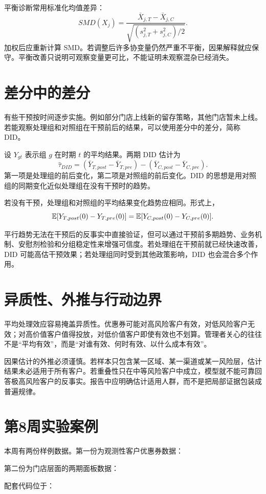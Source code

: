 \documentclass[UTF8,fontset=fandol,openany,zihao=-4]{ctexbook}
\begin{document}
平衡诊断常用标准化均值差异：
\[
  SMD(X_j)
  =
  \frac{\bar X_{j,T}-\bar X_{j,C}}
       {\sqrt{(s_{j,T}^{2}+s_{j,C}^{2})/2}}.
\]
加权后应重新计算 SMD。若调整后许多协变量仍然严重不平衡，因果解释就应保守。平衡改善只说明可观察变量更可比，不能证明未观察混杂已经消失。

\section{差分中的差分}

有些干预按时间逐步实施。例如部分门店上线新的留存策略，其他门店暂未上线。若能观察处理组和对照组在干预前后的结果，可以使用差分中的差分，简称 DID。

设 \(Y_{gt}\) 表示组 \(g\) 在时期 \(t\) 的平均结果。两期 DID 估计为
\[
  \widehat{\tau}_{DID}
  =
  (\bar Y_{T,post}-\bar Y_{T,pre})
  -
  (\bar Y_{C,post}-\bar Y_{C,pre}).
\]
第一项是处理组的前后变化，第二项是对照组的前后变化。DID 的思想是用对照组的同期变化近似处理组在没有干预时的趋势。

\begin{definition}[平行趋势假设]
若没有干预，处理组和对照组的平均结果变化趋势应相同。形式上，
\[
  \mathbb E[Y_{T,post}(0)-Y_{T,pre}(0)]
  =
  \mathbb E[Y_{C,post}(0)-Y_{C,pre}(0)].
\]
\end{definition}

平行趋势无法在干预后的反事实中直接验证，但可以通过干预前多期趋势、业务机制、安慰剂检验和分组稳定性来增强可信度。若处理组在干预前就已经快速改善，DID 可能高估干预效果；若处理组同时受到其他政策影响，DID 也会混合多个作用。

\section{异质性、外推与行动边界}

平均处理效应容易掩盖异质性。优惠券可能对高风险客户有效，对低风险客户无效；对高价值客户值得投放，对低价值客户即使有效也不划算。管理者关心的往往不是“平均有效”，而是“对谁有效、何时有效、以什么成本有效”。

因果估计的外推必须谨慎。若样本只包含某一区域、某一渠道或某一风险层，估计结果未必适用于所有客户。若重叠性只在中等风险客户中成立，模型就不能可靠回答极高风险客户的反事实。报告中应明确估计适用人群，而不是把局部证据包装成普遍规律。

\section{第8周实验案例}

本周有两份样例数据。第一份为观测性客户优惠券数据：
\begin{center}
\end{center}
第二份为门店层面的两期面板数据：
\begin{center}
\end{center}
配套代码位于：
\begin{center}
\end{center}
\end{document}
